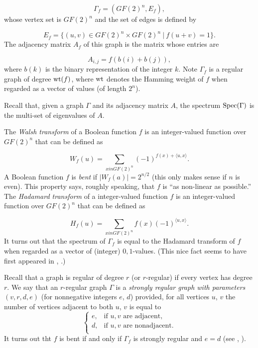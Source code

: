 \[
             \Gamma_f = (GF(2)^n, E_f ),
\]
whose vertex set is $GF(2)^n$ and the set of edges is defined by

\[
            E_f =\{ (u,v) \in GF(2)^n \times GF(2)^n \ |\ f(u+v)=1\}.
\]
The adjacency matrix $A_f$ of this graph is the matrix whose entries are

\[
        A_{i,j} = f(b(i) + b(j)),
\]
where $b(k)$ is the binary representation of the integer $k$.
Note $\Gamma_f$ is a regular graph of degree ${\rm wt}(f)$,
where ${\rm wt}$ denotes the
Hamming weight of $f$ when regarded as a vector of values (of length $2^n$).

Recall that, given a graph $\Gamma$ and its adjacency matrix $A$, the
spectrum ${\rm Spec}(\Gamma)$ is the multi-set of eigenvalues of $A$.

The {\it Walsh transform} of a Boolean function $f$ is an integer-valued
function over $GF(2)^n$ that can be defined as

\[
W_f(u) = \sum_{x in GF(2)^n} (-1)^{f(x)+ \langle u,x\rangle}.
\]
A Boolean function $f$ is {\it bent} if $|W_f(a)| = 2^{n/2}$ (this only makes
sense if $n$ is even). This property says, roughly speaking, that
$f$ is ``as non-linear as possible.''
The {\it Hadamard transform} of a integer-valued
function $f$ is an integer-valued function over $GF(2)^n$ that can be defined as

\[
H_f(u) = \sum_{x in GF(2)^n} f(x)(-1)^{\langle u,x\rangle}.
\]
It turns out that the spectrum of $\Gamma_f$ is equal to the Hadamard
transform of $f$ when regarded as a vector of (integer) $0,1$-values.
(This nice fact seems to have first appeared in \cite{Bernasconi1998},
\cite{BernasconiEtAl1999}.)

Recall that a graph is regular of degree $r$ (or $r$-regular) if every vertex has
degree $r$.    We say that an $r$-regular
graph $\Gamma$ is a {\it strongly regular graph with parameters $(v, r, d, e)$}
(for nonnegative integers $e$, $d$) provided, for all vertices $u$, $v$ the number
of vertices adjacent to both $u$, $v$ is equal to
\[
\begin{cases}
e, & \text{if } u, v \text{ are adjacent},    \\
d, & \text{if } u, v \text{ are nonadjacent}. \\
\end{cases}
\]
It turns out tht $f$ is bent if and only if
$\Gamma_f$ is strongly regular and $e = d$ (see \cite{BernasconiEtAl1999},
\cite{BernasconiEtAl2001}).


